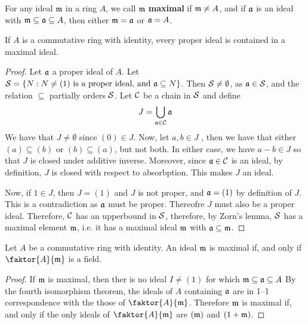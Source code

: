 \begin{definition}
    For any ideal $\mathfrak{m}$ in a ring $A$, we call $\mathfrak{m}$  \textbf{maximal}
    if $\mathfrak{m} \neq A$, and if $\mathfrak{a}$ is an ideal with  $\mathfrak{m} \subseteq \mathfrak{a} \subseteq
    A$, then either  $\mathfrak{m}=\mathfrak{a}$ or $\mathfrak{a}=A$.
\end{definition}

\begin{lemma}\label{1.4.2}
    If $A$ is a commutative ring with identity, every proper ideal is contained
    in a maximal ideal.
\end{lemma}
\begin{proof}
    Let $\mathfrak{a}$ a proper ideal of $A$. Let $\mathcal{S}=\{N : N \neq (1) \text{ is a proper
    ideal, and } \mathfrak{a} \subseteq N\}$. Then $\mathcal{S} \neq \emptyset$, as  $\mathfrak{a} \in \mathcal{S}$,
    and the relation $\subseteq$ partially orders $\mathcal{S}$. Let  $\mathcal{C}$ be a chain
    in $\mathcal{S}$ and define
    \begin{equation*}
        J=\bigcup_{\mathfrak{a} \in \mathcal{C}}{\mathfrak{a}}
    \end{equation*}
    We have that $J \neq \emptyset$ since  $(0) \in J$. Now, let $a,b \in J$ ,
    then we have that either  $(a) \subseteq (b)$ or $(b) \subseteq (a)$, but
    not both. In either case, we have $a-b \in J$ so that  $J$ is closed under
    additive inverse. Moreover, since  $\mathfrak{a} \in \mathcal{C}$ is an ideal, by definition,
    $J$ is closed with respect to absorbption. This makes  $J$ an ideal.

    Now, if  $1 \in J$, then $J=(1)$ and $J$ is not proper, and $\mathfrak{a}=(1)$ by
    definition of $J$. This is a contradiction as $\mathfrak{a}$ must be proper. Thereofre
    $J$ must also be a proper ideal. Therefore,  $\mathcal{C}$ has an upperbound in
    $\mathcal{S}$, therefore, by Zorn's lemma,  $\mathcal{S}$ has a maximal element $\mathfrak{m}$, i.e.
    it has a maximal ideal $\mathfrak{m}$ with  $\mathfrak{a} \subseteq \mathfrak{m}$.
\end{proof}

\begin{lemma}\label{1.4.3}
    Let $A$ be a commutative ring with identity. An ideal $\mathfrak{m}$ is maximal if,
    and only if  $\faktor{A}{\mf}$ is a field.
\end{lemma}
\begin{proof}
    If $\mathfrak{m}$ is maximal, then ther is no ideal $I \neq (1)$ for which $\mathfrak{m}
    \subseteq \mathfrak{a} \subseteq A$ By the fourth isomorphism theorem, the ideals of
    $A$ containing  $\mathfrak{a}$ are in 1--1 correspondence with the those of
    $\faktor{A}{\mf}$. Therefore $\mathfrak{m}$ is maximal if, and only if the only
    ideals of $\faktor{A}{\mf}$ are $(\mathfrak{m})$ and $(1+\mathfrak{m})$.
\end{proof}

